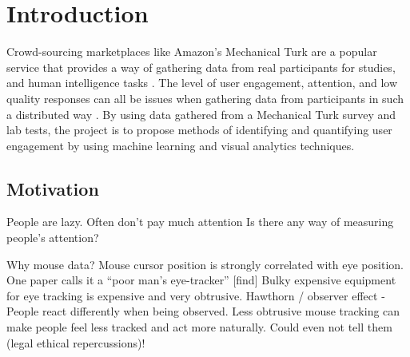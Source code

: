 \documentclass{article}
\begin{document}



\section{Introduction}

Crowd-sourcing marketplaces like Amazon’s Mechanical Turk are a popular service that provides a way of gathering data from real participants for studies, and human intelligence tasks \cite{paolacci2010running}. 
The level of user engagement, attention, and low quality responses can all be issues when gathering data from participants in such a distributed way \cite{ipeirotis2010quality}. 
By using data gathered from a Mechanical Turk survey and lab tests, the project is to propose methods of identifying and quantifying user engagement by using machine learning and visual analytics techniques.

\subsection{Motivation}



People are lazy. 
Often don't pay much attention 
Is there any way of measuring people's attention?

Why mouse data?
Mouse cursor position is strongly correlated with eye position. 
One paper calls it a “poor man's eye-tracker” [find]
Bulky expensive equipment for eye tracking is expensive and very obtrusive.
Hawthorn / observer effect - People react differently when being observed. 
Less obtrusive mouse tracking can make people feel less tracked and act more naturally. %
Could even not tell them (legal ethical repercussions)!
\end{document}
